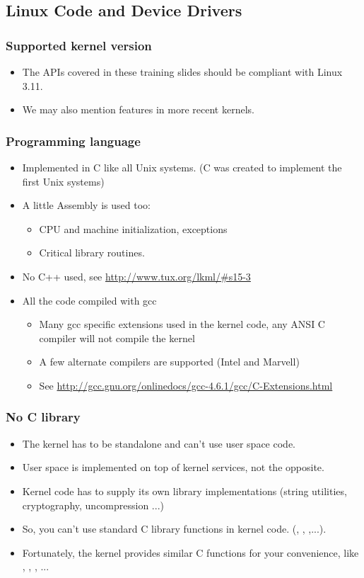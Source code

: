 \subsection{Linux Code and Device Drivers}

\begin{frame}
  \frametitle{Supported kernel version}
  \begin{itemize}
  \item The APIs covered in these training slides should be compliant
    with Linux 3.11.
  \item We may also mention features in more recent kernels.
  \end{itemize}
\end{frame}


\begin{frame}
  \frametitle{Programming language}
  \begin{itemize}
  \item Implemented in C like all Unix systems. (C was created to
    implement the first Unix systems)
  \item A little Assembly is used too:
    \begin{itemize}
    \item CPU and machine initialization, exceptions
    \item Critical library routines.
    \end{itemize}
  \item No C++ used, see \url{http://www.tux.org/lkml/\#s15-3}
  \item All the code compiled with gcc
    \begin{itemize}
    \item Many gcc specific extensions used in the kernel code, any
      ANSI C compiler will not compile the kernel
    \item A few alternate compilers are supported (Intel and Marvell)
    \item See
      \url{http://gcc.gnu.org/onlinedocs/gcc-4.6.1/gcc/C-Extensions.html}
    \end{itemize}
  \end{itemize}
\end{frame}

\begin{frame}
  \frametitle{No C library}
  \begin{itemize}
  \item The kernel has to be standalone and can't use user space code.
  \item User space is implemented on top of kernel services, not the
    opposite.
  \item Kernel code has to supply its own library implementations
    (string utilities, cryptography, uncompression ...)
  \item So, you can't use standard C library functions in kernel code.
    (, , ,...).
  \item Fortunately, the kernel provides similar C functions for your
    convenience, like , ,
    , ...
  \end{itemize}
\end{frame}

